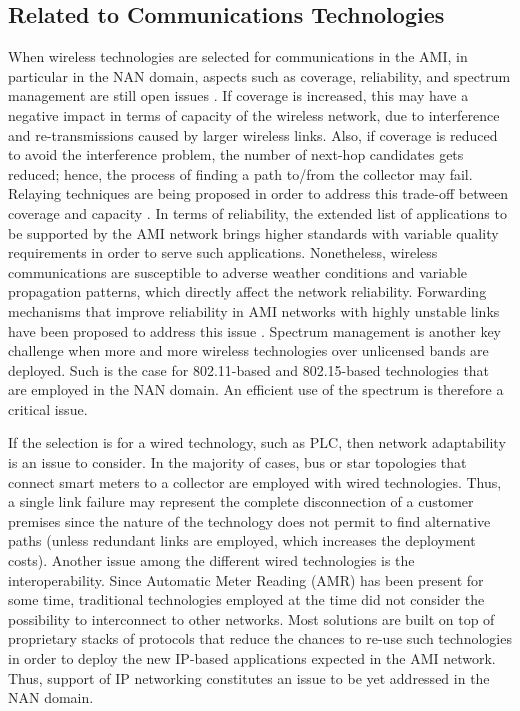 \documentclass[10pt,twocolumn,twoside,submit]{JCNtran}
\begin{document}
\subsection{Related to Communications Technologies}

When wireless technologies are selected for communications in the AMI, in particular in the NAN domain, aspects such as coverage, reliability, and spectrum management are still open issues \cite{Sun2012}. If coverage is increased, this may have a negative impact in terms of capacity of the wireless network, due to interference and re-transmissions caused by larger wireless links. Also, if coverage is reduced to avoid the interference problem, the number of next-hop candidates gets reduced; hence, the process of finding a path to/from the collector may fail. Relaying techniques are being proposed in order to address this trade-off between coverage and capacity \cite{Sun2012}. In terms of reliability, the extended list of applications to be supported by the AMI network brings higher standards with variable quality requirements in order to serve such applications. Nonetheless, wireless communications are susceptible to adverse weather conditions and variable propagation patterns, which directly affect the network reliability. Forwarding mechanisms that improve reliability in AMI networks with highly unstable links have been proposed to address this issue \cite{Cespedes2012}. Spectrum management is another key challenge when more and more wireless technologies over unlicensed bands are deployed. Such is the case for 802.11-based and 802.15-based technologies that are employed in the NAN domain. An efficient use of the spectrum is therefore a critical issue.

If the selection is for a wired technology, such as PLC, then network adaptability is an issue to consider. In the majority of cases, bus or star topologies that connect smart meters to a collector are employed with wired technologies. Thus, a single link failure may represent the complete disconnection of a customer premises since the nature of the technology does not permit to find alternative paths (unless redundant links are employed, which increases the deployment costs).  Another issue among the different wired technologies is the interoperability. Since Automatic Meter Reading (AMR) has been present for some time, traditional technologies employed at the time did not consider the possibility to interconnect to other networks. Most solutions are built on top of proprietary stacks of protocols that reduce the chances to re-use such technologies in order to deploy the new IP-based applications expected in the AMI network. Thus, support of IP networking constitutes an issue to be yet addressed in the NAN domain. 
\end{document}
